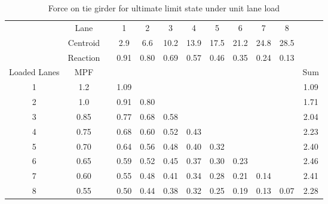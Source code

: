 \begin{table}[H]
\centering
\caption{Force on tie girder for ultimate limit state under unit lane load}
\label{tab:app_ll_uls}
\begin{tabular}{cccccccccccc}
\cline{2-11}
             & Lane     &  & 1    & 2    & 3    & 4    & 5    & 6    & 7    & 8    &      \\
             & Centroid &  & 2.9  & 6.6  & 10.2 & 13.9 & 17.5 & 21.2 & 24.8 & 28.5 &      \\
             & Reaction &  & 0.91 & 0.80 & 0.69 & 0.57 & 0.46 & 0.35 & 0.24 & 0.13 &      \\ \hline
Loaded Lanes & MPF      &  &      &      &      &      &      &      &      &      & Sum  \\ \hline
1            & 1.2      &  & 1.09 &      &      &      &      &      &      &      & 1.09 \\
2            & 1.0      &  & 0.91 & 0.80 &      &      &      &      &      &      & 1.71 \\
3            & 0.85     &  & 0.77 & 0.68 & 0.58 &      &      &      &      &      & 2.04 \\
4            & 0.75     &  & 0.68 & 0.60 & 0.52 & 0.43 &      &      &      &      & 2.23 \\
5            & 0.70     &  & 0.64 & 0.56 & 0.48 & 0.40 & 0.32 &      &      &      & 2.40 \\
6            & 0.65     &  & 0.59 & 0.52 & 0.45 & 0.37 & 0.30 & 0.23 &      &      & 2.46 \\
7            & 0.60     &  & 0.55 & 0.48 & 0.41 & 0.34 & 0.28 & 0.21 & 0.14 &      & 2.41 \\
8            & 0.55     &  & 0.50 & 0.44 & 0.38 & 0.32 & 0.25 & 0.19 & 0.13 & 0.07 & 2.28 \\ \hline
\end{tabular}
\end{table}